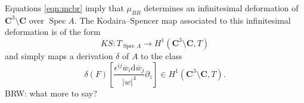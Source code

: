 \documentclass[11pt]{amsart}
\newcommand{\del}{\partial}
\newcommand{\eps}{\epsilon}
\newcommand{\br}{\overline}
\newcommand{\norm}[1]{\left\| #1 \right\|}
\renewcommand{\d}{\mathrm{d}}
\def\eps{{\epsilon}}
\newcommand\C{\mathbf{C}}
\DeclareMathOperator{\Spec}{Spec}
\def\brian#1{{\textcolor{blue!65!red}{BRW: {#1}}}}
\newcommand\beqn{\begin{equation}}
\newcommand\eeqn{\end{equation}}
\theoremstyle{thm}
\numberwithin{equation}{subsection}
\theoremstyle{def}
\theoremstyle{rem}
\begin{document}
Equations \eqref{eqn:mcbr} imply that $\mu_{BR}$ determines an infinitesimal deformation of~$\C^3 \setminus \C$ over $\Spec A$. 
The Kodaira--Spencer map associated to this infinitesimal deformation is of the form
\[
KS \colon T_{\Spec A} \to H^1(\C^3 \setminus \C, T) 
\]
and simply maps a derivation $\delta$ of $A$ to the class 
\[
\delta(F) \left[\frac{\eps^{ij} \br w_i \d \br w_j}{|w|^4} \del_z \right] \in H^1(\C^3 \setminus \C, T) .
\] 
\brian{what more to say?}
%
%
\end{document}
